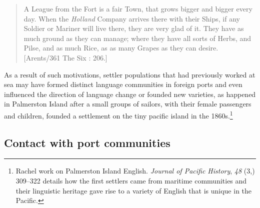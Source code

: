 \begin{quotation}
A League from the Fort is a fair Town, that grows bigger and bigger every day. When the \textit{Holland} Company arrives there with their Ships, if any Soldier or Mariner will live there, they are very glad of it. They have as much ground as they can manage; where they have all sorts of Herbs, and Pilse, and as much Rice, as as many Grapes as they can desire. [Arents/361 The Six \citealt{Voyages1678}: 206.]\end{quotation}

As a result of such motivations, settler populations that had previously worked at sea may have formed distinct language communities in foreign ports and even influenced the direction of language change or founded new varieties, as happened in Palmerston Island after a small groups of sailors, with their female passengers and children, founded a settlement on the tiny pacific island in the 1860s.\footnote{Rachel  work on Palmerston Island English. \textit{Journal of Pacific History}, \textit{48} (3,) 309–322 details how the first settlers came from maritime communities and their linguistic heritage gave rise to a variety of English that is unique in the Pacific.} 

\subsection{{Contact} {with} {port} {communities}}%

